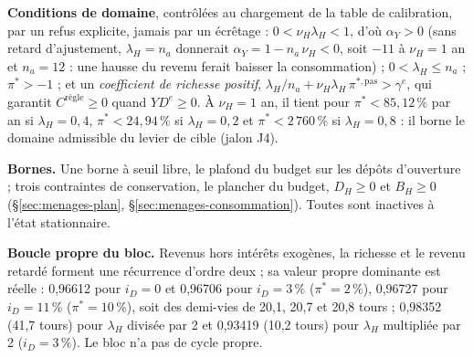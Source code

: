 \documentclass[11pt,a4paper]{article}
\begin{document}
\begin{proposee}
\textbf{Conditions de domaine}, contrôlées au chargement de la table de calibration, par un refus explicite, jamais par un écrêtage : $0 < \nu_H\lambda_H < 1$, d'où $\alpha_Y > 0$ (sans retard d'ajustement, $\lambda_H = n_a$ donnerait $\alpha_Y = 1 - n_a\,\nu_H < 0$, soit $-11$ à $\nu_H = 1$ an et $n_a = 12$ : une hausse du revenu ferait baisser la consommation) ; $0 < \lambda_H \le n_a$ ; $\pi^\ast > -1$ ; et un \emph{coefficient de richesse positif}, $\lambda_H/n_a + \nu_H\lambda_H\,\pi^{\ast,\mathrm{pas}} > \gamma^e$, qui garantit $C^{\text{règle}} \ge 0$ quand $\mathit{YD}^e \ge 0$. À $\nu_H = 1$ an, il tient pour $\pi^\ast < 85{,}12\,\%$ par an si $\lambda_H = 0{,}4$, $\pi^\ast < 24{,}94\,\%$ si $\lambda_H = 0{,}2$ et $\pi^\ast < 2\,760\,\%$ si $\lambda_H = 0{,}8$ : il borne le domaine admissible du levier de cible (jalon J4).

\textbf{Bornes.} Une borne à seuil libre, le plafond du budget sur les dépôts d'ouverture ; trois contraintes de conservation, le plancher du budget, $D_H \ge 0$ et $B_H \ge 0$ (\S\ref{sec:menages-plan}, \S\ref{sec:menages-consommation}). Toutes sont inactives à l'état stationnaire.

\textbf{Boucle propre du bloc.} Revenus hors intérêts exogènes, la richesse et le revenu retardé forment une récurrence d'ordre deux ; sa valeur propre dominante est réelle : 0,96612 pour $i_D = 0$ et 0,96706 pour $i_D = 3\,\%$ ($\pi^\ast = 2\,\%$), 0,96727 pour $i_D = 11\,\%$ ($\pi^\ast = 10\,\%$), soit des demi-vies de 20,1, 20,7 et 20,8 tours ; 0,98352 (41,7 tours) pour $\lambda_H$ divisée par 2 et 0,93419 (10,2 tours) pour $\lambda_H$ multipliée par 2 ($i_D = 3\,\%$). Le bloc n'a pas de cycle propre.


\end{proposee}
\end{document}

